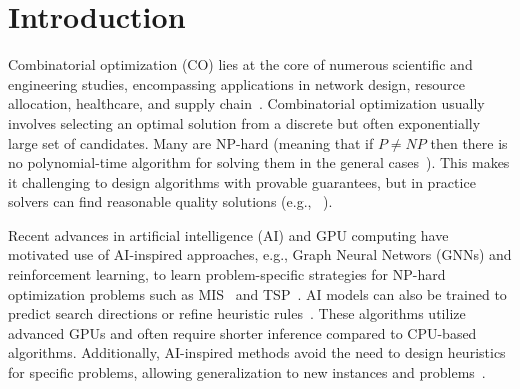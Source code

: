 \section{Introduction}

Combinatorial optimization (CO) lies at the core of numerous scientific and engineering studies, encompassing applications in network design, resource allocation, healthcare, and supply chain~\citep{du1998handbook, hoffman2000combinatorial, zhong2021preface}. Combinatorial optimization usually involves selecting an optimal solution from a discrete but often exponentially large set of candidates. 
Many are NP-hard (meaning that if $P \neq NP$ then there is no polynomial-time algorithm for solving them in the general cases~\citep{papadimitriou1998combinatorial}). This makes it challenging to design algorithms with provable guarantees, but in practice solvers can find reasonable quality solutions (e.g., \gurobi~\citep{gurobi}). 


Recent advances in artificial intelligence (AI) and GPU computing have motivated use of AI-inspired approaches, e.g., Graph Neural Networs (GNNs) and reinforcement learning,  to learn problem-specific strategies for NP-hard optimization problems such as MIS~\citep{li2018combinatorial, ahn2020learning} and TSP~\citep{kool2018attention, zhang2021solving}. AI models can also be trained to predict search directions or refine heuristic rules~\citep{li2018combinatorial, d2020learning}. These algorithms utilize advanced GPUs and often require shorter inference compared to CPU-based algorithms. Additionally, AI-inspired methods avoid the need to design heuristics for specific problems, allowing generalization to new instances and problems~\citep{bengio2021machine, cappart2023combinatorial}.







